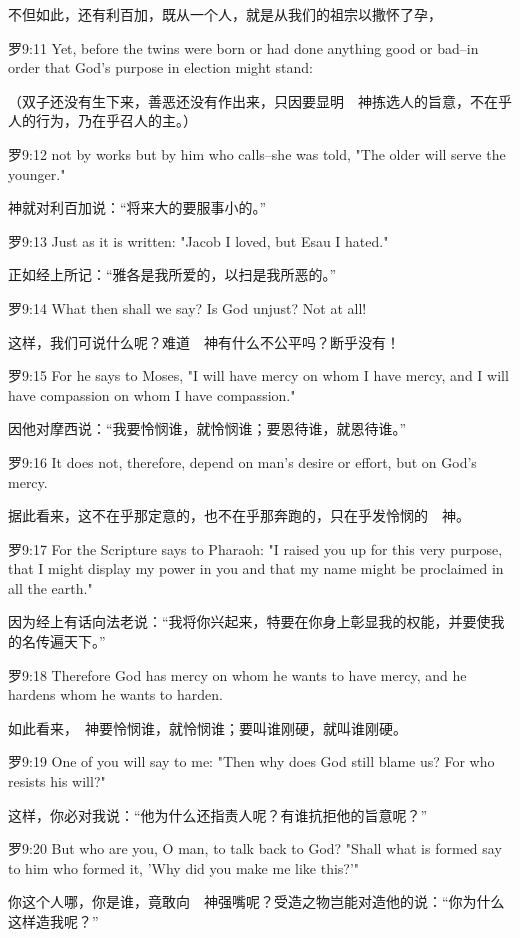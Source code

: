 \documentclass[a4paper,11pt,onecolumn,twoside]{ctexart}
\begin{document}
\begin{multicols}{2}
 不但如此，还有利百加，既从一个人，就是从我们的祖宗以撒怀了孕，


 罗9:11
 Yet, before the twins were born or had done anything good or bad--in order that God's purpose in election might stand:

 （双子还没有生下来，善恶还没有作出来，只因要显明　神拣选人的旨意，不在乎人的行为，乃在乎召人的主。）


 罗9:12
 not by works but by him who calls--she was told, "The older will serve the younger."

 神就对利百加说：“将来大的要服事小的。”


 罗9:13
 Just as it is written: "Jacob I loved, but Esau I hated."

 正如经上所记：“雅各是我所爱的，以扫是我所恶的。”


 罗9:14
 What then shall we say? Is God unjust? Not at all!

 这样，我们可说什么呢？难道　神有什么不公平吗？断乎没有！


 罗9:15
 For he says to Moses, "I will have mercy on whom I have mercy, and I will have compassion on whom I have compassion."

 因他对摩西说：“我要怜悯谁，就怜悯谁；要恩待谁，就恩待谁。”


 罗9:16
 It does not, therefore, depend on man's desire or effort, but on God's mercy.

 据此看来，这不在乎那定意的，也不在乎那奔跑的，只在乎发怜悯的　神。


 罗9:17
 For the Scripture says to Pharaoh: "I raised you up for this very purpose, that I might display my power in you and that my name might be proclaimed in all the earth."

 因为经上有话向法老说：“我将你兴起来，特要在你身上彰显我的权能，并要使我的名传遍天下。”


 罗9:18
 Therefore God has mercy on whom he wants to have mercy, and he hardens whom he wants to harden.

 如此看来，　神要怜悯谁，就怜悯谁；要叫谁刚硬，就叫谁刚硬。


 罗9:19
 One of you will say to me: "Then why does God still blame us? For who resists his will?"

 这样，你必对我说：“他为什么还指责人呢？有谁抗拒他的旨意呢？”


 罗9:20
 But who are you, O man, to talk back to God? "Shall what is formed say to him who formed it, 'Why did you make me like this?'"

 你这个人哪，你是谁，竟敢向　神强嘴呢？受造之物岂能对造他的说：“你为什么这样造我呢？”



\end{multicols}
\end{document}
